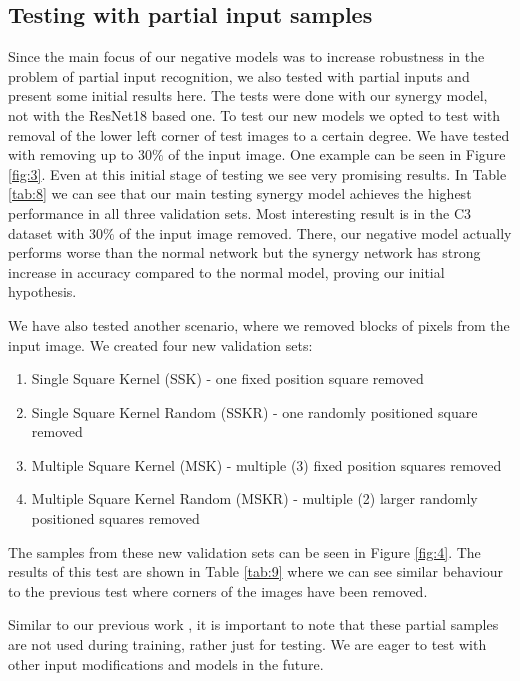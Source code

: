 \documentclass[b5paper]{book}
\let\cite\parencite
\begin{document}
\subsection{Testing with partial input samples}
\label{partial}

Since the main focus of our negative models \cite{milovsevic2019classification} was to increase robustness in the problem of partial input recognition, we also tested with partial inputs and present some initial results here. The tests were done with our synergy model, not with the ResNet18 based one. To test our new models we opted to test with removal of the lower left corner of test images to a certain degree. We have tested with removing up to \( 30\% \) of the input image. One example can be seen in Figure \ref{fig:3}. Even at this initial stage of testing we see very promising results. In Table \ref{tab:8} we can see that our main testing synergy model achieves the highest performance in all three validation sets. Most interesting result is in the C3 dataset with \( 30\% \) of the input image removed. There, our negative model actually performs worse than the normal network but the synergy network has strong increase in accuracy compared to the normal model, proving our initial hypothesis.

We have also tested another scenario, where we removed blocks of pixels from the input image. We created four new validation sets:

\begin{enumerate}
    \item Single Square Kernel (SSK) - one fixed position square removed
    \item Single Square Kernel Random (SSKR) - one randomly positioned square removed
    \item Multiple Square Kernel (MSK) - multiple (3) fixed position squares removed
    \item Multiple Square Kernel Random (MSKR) - multiple (2) larger randomly positioned squares removed
\end{enumerate}

The samples from these new validation sets can be seen in Figure \ref{fig:4}. The results of this test are shown in Table \ref{tab:9} where we can see similar behaviour to the previous test where corners of the images have been removed.

Similar to our previous work \cite{milovsevic2019classification}, it is important to note that these partial samples are not used during training, rather just for testing. We are eager to test with other input modifications and models in the future.
\end{document}
